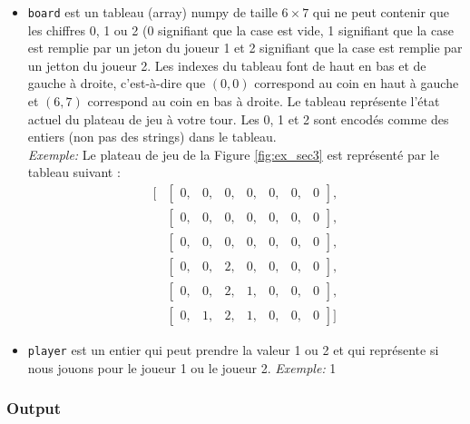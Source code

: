 \documentclass[11pt,answers]{exam}
\begin{document}
\begin{itemize}
	\item \texttt{board} est un tableau (array) numpy de taille $6 \times 7$ qui ne peut contenir que les chiffres 0, 1 ou 2 (0 signifiant que la case est vide, 1 signifiant que la case est remplie par un jeton du joueur 1 et 2 signifiant que la case est remplie par un jetton du joueur 2. Les indexes du tableau font de haut en bas et de gauche à droite, c'est-à-dire que $(0,0)$ correspond au coin en haut à gauche et $(6,7)$ correspond au coin en bas à droite.
	      Le tableau représente l'état actuel du plateau de jeu à votre tour. Les 0, 1 et 2 sont encodés comme des entiers (non pas des strings) dans le tableau.\\
	      \emph{Exemple:} Le plateau de jeu de la Figure \ref{fig:ex_sec3} est représenté par le tableau suivant :
	      \begin{align*}
		      \Bigg[ & \begin{bmatrix} 0, & 0, & 0, & 0, & 0, & 0, & 0 \end{bmatrix},       \\
		             & \begin{bmatrix} 0, & 0, & 0, & 0, & 0, & 0, & 0 \end{bmatrix},       \\
		             & \begin{bmatrix} 0, & 0, & 0, & 0, & 0, & 0, & 0 \end{bmatrix},       \\
		             & \begin{bmatrix} 0, & 0, & 2, & 0, & 0, & 0, & 0 \end{bmatrix},       \\
		             & \begin{bmatrix} 0, & 0, & 2, & 1, & 0, & 0, & 0 \end{bmatrix},       \\
		             & \begin{bmatrix} 0, & 1, & 2, & 1, & 0, & 0, & 0 \end{bmatrix} \Bigg]
	      \end{align*}

	\item \texttt{player} est un entier qui peut prendre la valeur 1 ou 2 et qui représente si nous jouons pour le joueur 1 ou le joueur 2. \emph{Exemple:} 1
\end{itemize}



\subsubsection*{Output}
\end{document}
